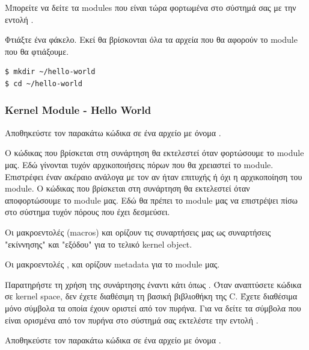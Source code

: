 \documentclass[18pt]{extarticle}
\begin{document}
Μπορείτε να δείτε τα modules που είναι τώρα φορτωμένα στο σύστημά σας με την
εντολή .

Φτιάξτε ένα φάκελο.
Εκεί θα βρίσκονται όλα τα αρχεία που θα αφορούν το module που θα φτιάξουμε.

\begin{commandline}
	\begin{verbatim}
$ mkdir ~/hello-world
$ cd ~/hello-world
	\end{verbatim}
\end{commandline}

\subsubsection{Kernel Module - Hello World}

Αποθηκεύστε τον παρακάτω κώδικα σε ένα αρχείο με όνομα .

\begin{file}[hello.c]
    
\end{file}

Ο κώδικας που βρίσκεται στη συνάρτηση  θα εκτελεστεί όταν φορτώσουμε το module μας. 
Εδώ γίνονται τυχόν αρχικοποιήσεις πόρων που θα χρειαστεί το module. 
Επιστρέφει έναν ακέραιο ανάλογα με τον αν ήταν επιτυχής ή όχι η αρχικοποίηση του module.
Ο κώδικας που βρίσκεται στη συνάρτηση  θα εκτελεστεί όταν αποφορτώσουμε το module μας. 
Εδώ θα πρέπει το module μας να επιστρέψει πίσω στο σύστημα τυχόν πόρους που έχει δεσμεύσει.

Οι μακροεντολές (macros)  και  ορίζουν τις συναρτήσεις μας ως συναρτήσεις "εκίννησης" και "εξόδου" για το τελικό kernel object.

Οι μακροεντολές ,  και  ορίζουν metadata για το module μας.

Παρατηρήστε τη χρήση της συνάρτησης  έναντι κάτι όπως .
Όταν αναπτύσετε κώδικα σε kernel space, δεν έχετε διαθέσιμη τη βασική βιβλιοθήκη της C. 
Έχετε διαθέσιμα μόνο σύμβολα τα οποία έχουν οριστεί από τον πυρήνα.
Για να δείτε τα σύμβολα που είναι ορισμένα από τον πυρήνα στο σύστημά σας εκτελέστε την εντολή .

Αποθηκεύστε τον παρακάτω κώδικα σε ένα αρχείο με όνομα .

\begin{file}[Makefile]
    \footnotesize 
\end{file}
\end{document}
